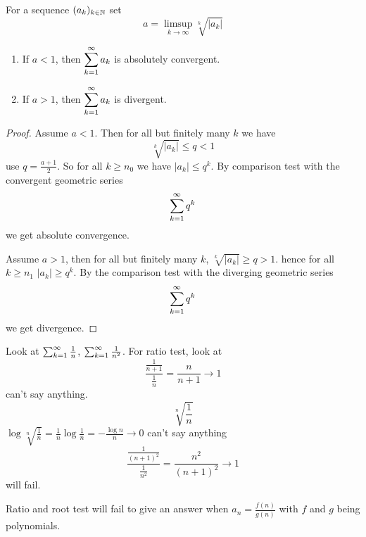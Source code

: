 \documentclass[10pt, a4paper]{article}
\newcommand{\dseq}[2][n]{(#2_#1)_{#1 \in \N}}
\begin{document}
\begin{theorem}
    For a sequence $\dseq[k]{a}$ set
    \[
    a = \limsup_{k \rightarrow \infty}\sqrt[k]{|a_k|}
    \]
    \begin{enumerate}[label = (\alph*)]
        \item If $a < 1$,
        then $\displaystyle\infsum[k = 1]a_k$ is absolutely convergent.
        \item If $a > 1$,
        then $\displaystyle\infsum[k = 1]a_k$ is divergent.
    \end{enumerate}
    \begin{proof}
        Assume $a < 1$.
        Then for all but finitely many $k$ we have
        \[
        \sqrt[k]{|a_k|} \leq q < 1
        \]
        use $q = \frac{a + 1}{2}$.
        So for all $k \geq n_0$ we have $|a_k| \leq q ^ k$.
        By comparison test with the convergent geometric series
        \[
        \infsum[k = 1]q ^ k
        \]
        we get absolute convergence.

        Assume $a > 1$,
        then for all but finitely many $k$,
        $\sqrt[k]{|a_k|} \geq q > 1$.
        hence for all $k \geq n_1$ $|a_k| \geq q ^ k$.
        By the comparison test with the diverging geometric series
        \[
        \infsum[k = 1]q ^ k
        \]
        we get divergence.
    \end{proof}
\end{theorem}

\begin{example}
    Look at $\infsum\frac{1}{n}$,
    $\infsum\frac{1}{n ^ 2}$.
    For ratio test,
    look at
    \[
    \frac{\frac{1}{n + 1}}{\frac{1}{n}} = \frac{n}{n + 1} \rightarrow 1
    \]
    can't say anything.
    \[
    \sqrt[n]{\frac{1}{n}}
    \]
    $\log\sqrt[n]{\frac{1}{n}} = \frac{1}{n}\log\frac{1}{n} = -\frac{\log n}{n} \rightarrow 0$
    can't say anything
    \[
    \frac{\frac{1}{(n + 1) ^ 2}}{\frac{1}{n ^ 2}} = \frac{n ^ 2}{(n + 1) ^ 2} \rightarrow 1
    \]
    will fail.
\end{example}

Ratio and root test will fail to give an answer when $a_n = \frac{f(n)}{g(n)}$ with $f$ and $g$ being polynomials.
\end{document}
